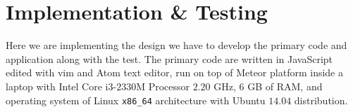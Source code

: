 \chapter{Implementation \& Testing}
\label{chap:implementation-testing}

Here we are implementing the design we have to develop the primary code and application along with the test.
The primary code are written in JavaScript edited with vim and Atom text editor, run on top of Meteor platform inside a laptop with Intel Core i3-$2330$M Processor $2.20$ GHz, $6$ GB of RAM, and operating system of Linux \verb|x86_64| architecture with Ubuntu $14.04$ distribution.
